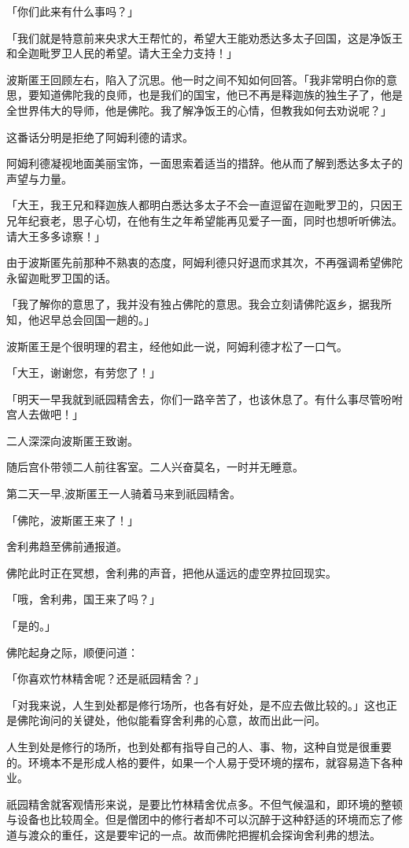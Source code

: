 \documentclass[twoside,openany]{book}
\begin{document}
「你们此来有什么事吗？」

「我们就是特意前来央求大王帮忙的，希望大王能劝悉达多太子回国，这是净饭王和全迦毗罗卫人民的希望。请大王全力支持！」

波斯匿王回顾左右，陷入了沉思。他一时之间不知如何回答。「我非常明白你的意思，要知道佛陀我的良师，也是我们的国宝，他已不再是释迦族的独生子了，他是全世界伟大的导师，他是佛陀。我了解净饭王的心情，但教我如何去劝说呢？」

这番话分明是拒绝了阿姆利德的请求。

阿姆利德凝视地面美丽宝饰，一面思索着适当的措辞。他从而了解到悉达多太子的声望与力量。

「大王，我王兄和释迦族人都明白悉达多太子不会一直逗留在迦毗罗卫的，只因王兄年纪衰老，思子心切，在他有生之年希望能再见爱子一面，同时也想听听佛法。请大王多多谅察！」

由于波斯匿先前那种不熟衷的态度，阿姆利德只好退而求其次，不再强调希望佛陀永留迦毗罗卫国的话。

「我了解你的意思了，我并没有独占佛陀的意思。我会立刻请佛陀返乡，据我所知，他迟早总会回国一趟的。」

波斯匿王是个很明理的君主，经他如此一说，阿姆利德才松了一口气。

「大王，谢谢您，有劳您了！」

「明天一早我就到祇园精舍去，你们一路辛苦了，也该休息了。有什么事尽管吩咐宫人去做吧！」

二人深深向波斯匿王致谢。

随后宫仆带领二人前往客室。二人兴奋莫名，一时并无睡意。

第二天一早,波斯匿王一人骑着马来到祇园精舍。

「佛陀，波斯匿王来了！」

舍利弗趋至佛前通报道。

佛陀此时正在冥想，舍利弗的声音，把他从遥远的虚空界拉回现实。

「哦，舍利弗，国王来了吗？」

「是的。」

佛陀起身之际，顺便问道：

「你喜欢竹林精舍呢？还是祇园精舍？」

「对我来说，人生到处都是修行场所，也各有好处，是不应去做比较的。」这也正是佛陀询问的关键处，他似能看穿舍利弗的心意，故而出此一问。

人生到处是修行的场所，也到处都有指导自己的人、事、物，这种自觉是很重要的。环境本不是形成人格的要件，如果一个人易于受环境的摆布，就容易造下各种业。

祇园精舍就客观情形来说，是要比竹林精舍优点多。不但气候温和，即环境的整顿与设备也比较周全。但是僧团中的修行者却不可以沉醉于这种舒适的环境而忘了修道与渡众的重任，这是要牢记的一点。故而佛陀把握机会探询舍利弗的想法。
\end{document}

